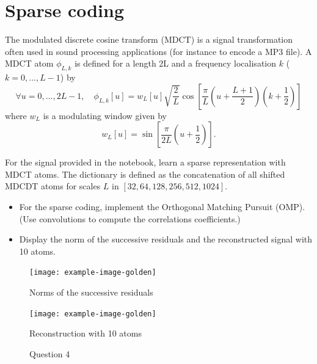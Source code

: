 \documentclass[11pt]{article}
\begin{document}
\newpage
\section{Sparse coding}

The modulated discrete cosine transform (MDCT) is a signal transformation often used in sound processing applications (for instance to encode a MP3 file).
A MDCT atom $\phi_{L,k}$ is defined for a length 2L and a frequency localisation $k$ ($k=0,\dots,L-1$) by
\begin{equation}
\forall u=0,\dots,2L-1,\quad\phi_{L,k}[u]=w_{L}[u]\sqrt{\frac{2}{L}} \cos [ \frac{\pi}{L} \left(u+ \frac{L+1}{2}\right) (k+\frac{1}{2}) ]
\end{equation}
where $w_{L}$ is a modulating window given by
\begin{equation}
w_L[u] = \sin \left[{\frac {\pi }{2L}}\left(u+{\frac {1}{2}}\right)\right].
\end{equation}


\begin{exercise}[subtitle=Sparse coding with OMP]
For the signal provided in the notebook, learn a sparse representation with MDCT atoms.
The dictionary is defined as the concatenation of all shifted MDCDT atoms for scales $L$ in $[32, 64, 128, 256, 512, 1024]$.

\begin{itemize}
    \item For the sparse coding, implement the Orthogonal Matching Pursuit (OMP). (Use convolutions to compute the correlations coefficients.)
    \item Display the norm of the successive residuals and the reconstructed signal with 10 atoms.
\end{itemize}

\end{exercise}
\begin{solution}


\begin{figure}
    \centering
    \begin{minipage}[t]{0.45\textwidth}
    \centerline{\texttt{[image: example-image-golden]}}
    \centerline{Norms of the successive residuals}
    \end{minipage}
    \hfill
    \begin{minipage}[t]{0.45\textwidth}    \centerline{\texttt{[image: example-image-golden]}}
    \centerline{Reconstruction with 10 atoms}
    \end{minipage}
    \caption{Question 4}
\end{figure}



\end{solution}
\end{document}
